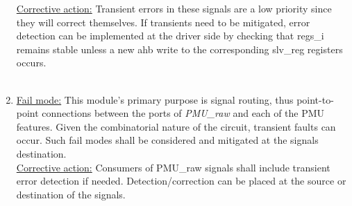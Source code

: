 \begin{enumerate}
\underline{Corrective action:}
 Transient errors in these signals are a low priority since they will correct themselves. If transients need to be mitigated, error detection can be implemented at the driver side by checking that regs\_i remains stable unless a new ahb write to the corresponding slv\_reg registers occurs.
\\
\\
\item \underline{Fail mode:} This module's primary purpose is signal routing, thus point-to-point connections between the ports of \textit{PMU\_raw} and each of the PMU features. Given the combinatorial nature of the circuit, transient faults can occur. Such fail modes shall be considered and mitigated at the signals destination.\\
\underline{Corrective action:} Consumers of PMU\_raw signals shall include transient error detection if needed. Detection/correction can be placed at the source or destination of the signals.\\
\\
\end{enumerate}
